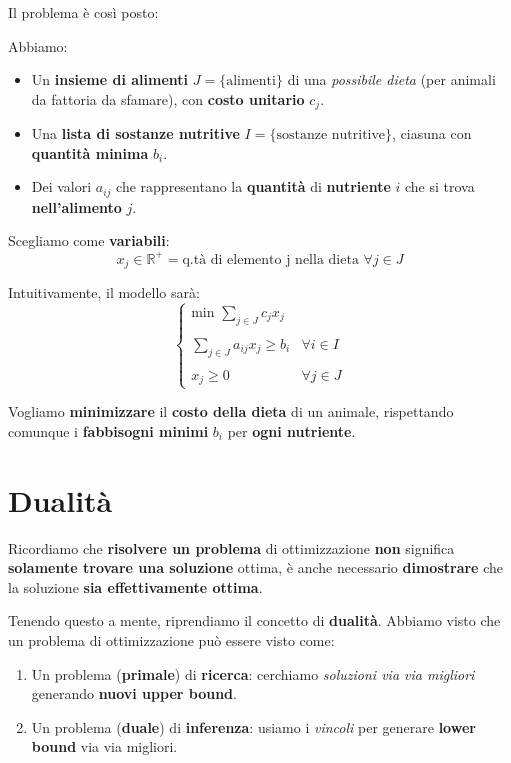 Il problema è così posto:

\begin{definition}
    Abbiamo:
    \begin{itemize}
        \item Un \textbf{insieme di alimenti} $J=\{\text{alimenti}\}  $ di una \textit{possibile dieta} 
        (per animali da fattoria da sfamare), con \textbf{costo unitario} $c_j$. 
        \item Una \textbf{lista di sostanze nutritive} $I=\{\text{sostanze nutritive}\}$, 
        ciasuna con \textbf{quantità minima} $b_i$. 
        \item Dei valori $a_{ij}$ che rappresentano la \textbf{quantità} di \textbf{nutriente} 
        $i$ che si trova \textbf{nell'alimento} $j$.
    \end{itemize}
\end{definition}

Scegliamo come \textbf{variabili}:
\[
    x_j \in \mathbb{R}^+ = \text{q.tà di elemento j nella dieta }\forall j\in J
\]

Intuitivamente, il modello sarà:
\[
    \begin{cases}
        \text{min } \sum_{j\in J} c_j x_j \\ \\ 
        \sum_{j\in J} a_{ij}x_j \ge b_i & \forall i\in I \\ \\ 
        x_j \ge 0 & \forall j\in J
    \end{cases}
\]

\begin{remark}
    Vogliamo \textbf{minimizzare} il \textbf{costo della dieta} di un animale, rispettando
    comunque i \textbf{fabbisogni minimi} $b_i$ per \textbf{ogni nutriente}.
\end{remark}

\section{Dualità}

Ricordiamo che \textbf{risolvere un problema} di ottimizzazione \textbf{non} significa 
\textbf{solamente trovare una soluzione} ottima, è anche necessario \textbf{dimostrare}
che la soluzione \textbf{sia effettivamente ottima}.

Tenendo questo a mente, riprendiamo il concetto di \textbf{dualità}. 
Abbiamo visto che un problema di ottimizzazione può essere visto come:
\begin{enumerate}
    \item Un problema (\textbf{primale}) di \textbf{ricerca}: cerchiamo 
        \textit{soluzioni via via migliori} generando \textbf{nuovi upper bound}.
    \item Un problema (\textbf{duale}) di \textbf{inferenza}: usiamo i \textit{vincoli}
        per generare \textbf{lower bound} via via migliori.
\end{enumerate}

